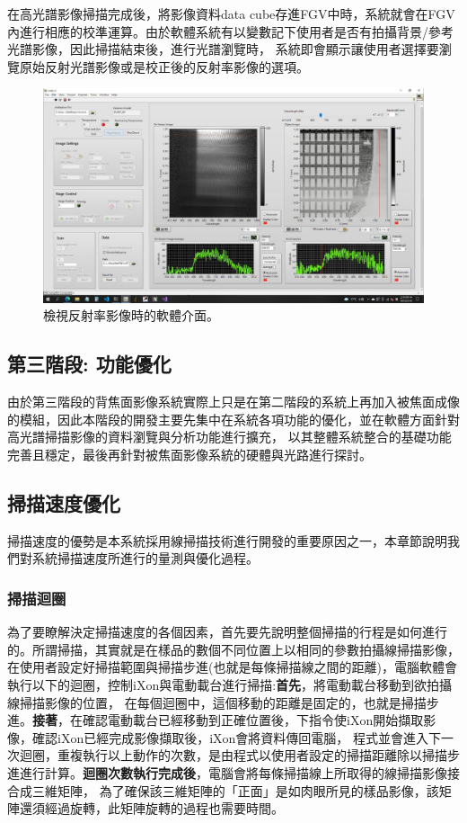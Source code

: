 \documentclass[12pt]{article}
\begin{document}
在高光譜影像掃描完成後，將影像資料data cube存進FGV中時，系統就會在FGV內進行相應的校準運算。由於軟體系統有以變數記下使用者是否有拍攝背景/參考光譜影像，因此掃描結束後，進行光譜瀏覽時，
系統即會顯示讓使用者選擇要瀏覽原始反射光譜影像或是校正後的反射率影像的選項。
\begin{figure}[ht]
    \centering
    \includegraphics[width=\linewidth]{reflection.jpeg}
    \caption{檢視反射率影像時的軟體介面。}
    \label{figure: reflection}
\end{figure}

\subsection{第三階段: 功能優化}
由於第三階段的背焦面影像系統實際上只是在第二階段的系統上再加入被焦面成像的模組，因此本階段的開發主要先集中在系統各項功能的優化，並在軟體方面針對高光譜掃描影像的資料瀏覽與分析功能進行擴充，
以其整體系統整合的基礎功能完善且穩定，最後再針對被焦面影像系統的硬體與光路進行探討。

\subsection{掃描速度優化}
掃描速度的優勢是本系統採用線掃描技術進行開發的重要原因之一，本章節說明我們對系統掃描速度所進行的量測與優化過程。
\subsubsection{掃描迴圈}
為了要瞭解決定掃描速度的各個因素，首先要先說明整個掃描的行程是如何進行的。所謂掃描，其實就是在樣品的數個不同位置上以相同的參數拍攝線掃描影像，
在使用者設定好掃描範圍與掃描步進(也就是每條掃描線之間的距離)，電腦軟體會執行以下的迴圈，控制iXon與電動載台進行掃描:\textbf{首先}，將電動載台移動到欲拍攝線掃描影像的位置，
在每個迴圈中，這個移動的距離是固定的，也就是掃描步進。\textbf{接著}，在確認電動載台已經移動到正確位置後，下指令使iXon開始擷取影像，確認iXon已經完成影像擷取後，iXon會將資料傳回電腦，
程式並會進入下一次迴圈，重複執行以上動作的次數，是由程式以使用者設定的掃描距離除以掃描步進進行計算。\textbf{迴圈次數執行完成後}，電腦會將每條掃描線上所取得的線掃描影像接合成三維矩陣，
為了確保該三維矩陣的「正面」是如肉眼所見的樣品影像，該矩陣還須經過旋轉，此矩陣旋轉的過程也需要時間。
\end{document}
